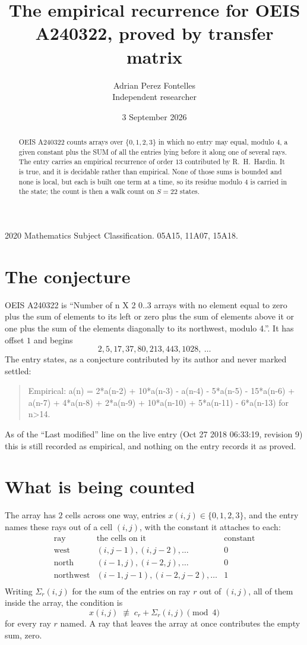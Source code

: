 \documentclass[11pt,a4paper]{article}
\title{The empirical recurrence for OEIS A240322, proved by transfer matrix}
\author{Adrian Perez Fontelles\\ \small Independent researcher}
\date{3 September 2026}
\theoremstyle{plain}
\theoremstyle{definition}
\begin{document}
\maketitle

\begin{abstract}
OEIS A240322 counts arrays over $\{0,1,2,3\}$ in which no entry may equal, modulo $4$, a given
constant plus the SUM of all the entries lying before it along one of several rays. The entry
carries an empirical recurrence of order $13$ contributed by R.~H.~Hardin. It is true, and
it is decidable rather than empirical. None of those sums is bounded and none is local, but
each is built one term at a time, so its residue modulo $4$ is carried in the state; the
count is then a walk count on $S=22$ states.
\end{abstract}

\noindent\small 2020 Mathematics Subject Classification. 05A15, 11A07, 15A18.\normalsize

\section{The conjecture}

OEIS A240322 is ``Number of n X 2 0..3 arrays with no element equal to zero plus the sum of elements to its left or zero plus the sum of elements above it or one plus the sum of the elements diagonally to its northwest, modulo 4.''. It has offset $1$ and begins
\[
2, 5, 17, 37, 80, 213, 443, 1028,\ \dots
\]
The entry states, as a conjecture contributed by its author and never marked settled:
\begin{quote}
Empirical: a(n) = 2*a(n-2) + 10*a(n-3) - a(n-4) - 5*a(n-5) - 15*a(n-6) + a(n-7) + 4*a(n-8) + 2*a(n-9) + 10*a(n-10) + 5*a(n-11) - 6*a(n-13) for n>14.
\end{quote}
As of the ``Last modified'' line on the live entry (Oct 27 2018 06:33:19, revision 9) this is still
recorded as empirical, and nothing on the entry records it as proved.

\section{What is being counted}

The array has $2$ cells across one way, entries $x(i,j)\in\{0,1,2,3\}$, and the entry names these
rays out of a cell $(i,j)$, with the constant it attaches to each:
\[
\begin{array}{lll}
\text{ray} & \text{the cells on it} & \text{constant} \\[2pt]
\text{west} & (i,j-1),(i,j-2),\dots & 0 \\
\text{north} & (i-1,j),(i-2,j),\dots & 0 \\
\text{northwest} & (i-1,j-1),(i-2,j-2),\dots & 1 \\
\end{array}
\]
Writing $\Sigma_r(i,j)$ for the sum of the entries on ray $r$ out of $(i,j)$, all of them
inside the array, the condition is
\[
x(i,j)\;\not\equiv\;c_r+\Sigma_r(i,j) \pmod{4}
\]
for every ray $r$ named. A ray that leaves the array at once contributes the empty sum,
zero.
\end{document}
